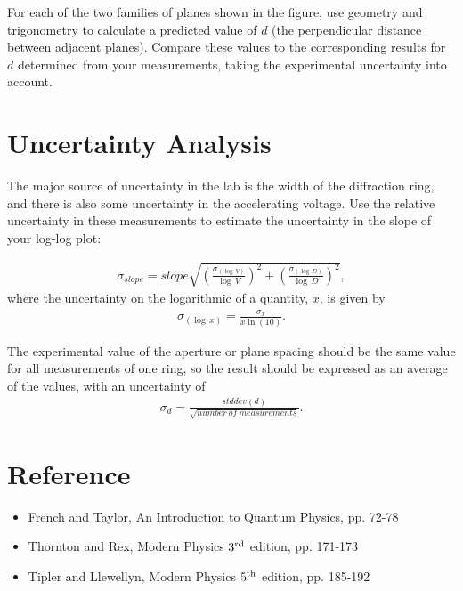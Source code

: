 \begin{enumerate}
For each of the two families of planes shown in the figure, use geometry
and trigonometry to calculate a predicted value of $d$ (the perpendicular
distance between adjacent planes).  Compare these values to the
corresponding results for $d$ determined from your measurements, taking
the experimental uncertainty into account.

\end{enumerate}

\section{Uncertainty Analysis}

The major source of uncertainty in the lab is the width of the diffraction ring,
and there is also some uncertainty in the accelerating voltage.  Use the
relative uncertainty in these measurements to estimate the uncertainty in the
slope of your log-log plot:

\begin{align*}
\sigma_{slope} = slope \sqrt{\left(\frac{\sigma_{(\log\,V)}}{\log\,V}\right)^2 +
  \left(\frac{\sigma_{(\log\,D)}}{\log\,D}\right)^2},
\end{align*}
\noindent where the uncertainty on the logarithmic of a quantity, $x$, is given
by 
\begin{align*}
  \sigma_{(\log\,x)} = \frac{\sigma_x}{x\ln(10)}.
\end{align*}

The experimental value of the aperture or plane spacing should be the same value
for all measurements of one ring, so the result should be expressed as an
average of the values, with an uncertainty of
\begin{align*}
\sigma_d = \frac{stddev(d)}{\sqrt{number\ of\ measurements}}.
\end{align*}


\section{Reference}
\begin{itemize}
\item French and Taylor, An Introduction to Quantum Physics, pp. 72-78
\item Thornton and Rex, Modern Physics $3^{\rm rd}$ edition, pp. 171-173
\item Tipler and Llewellyn, Modern Physics $5^{\rm th}$ edition, pp. 185-192

\end{itemize}
